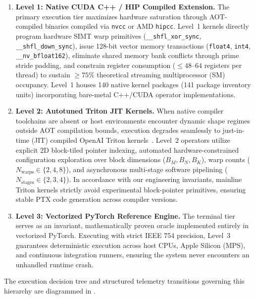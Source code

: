 \begin{enumerate}
    \item \textbf{Level 1: Native CUDA C++ / HIP Compiled Extension.}
    The primary execution tier maximizes hardware saturation through AOT-compiled binaries compiled via \texttt{nvcc} or AMD \texttt{hipcc}. Level~1 kernels directly program hardware SIMT warp primitives (\texttt{\_\_shfl\_xor\_sync}, \texttt{\_\_shfl\_down\_sync}), issue 128-bit vector memory transactions (\texttt{float4}, \texttt{int4}, \texttt{\_\_nv\_bfloat162}), eliminate shared memory bank conflicts through prime stride padding, and constrain register consumption ($\le 48\text{--}64$ registers per thread) to sustain $\ge 75\%$ theoretical streaming multiprocessor (SM) occupancy. Level~1 houses 140 native kernel packages (141 package inventory units) incorporating bare-metal C++/CUDA operator implementations.
    
    \item \textbf{Level 2: Autotuned Triton JIT Kernels.}
    When native compiler toolchains are absent or host environments encounter dynamic shape regimes outside AOT compilation bounds, execution degrades seamlessly to just-in-time (JIT) compiled OpenAI Triton kernels~\cite{tillet2019triton}. Level~2 operators utilize explicit 2D block-tiled pointer indexing, automated hardware-constrained configuration exploration over block dimensions ($B_M, B_N, B_K$), warp counts ($N_{\text{warps}} \in \{2, 4, 8\}$), and asynchronous multi-stage software pipelining ($N_{\text{stages}} \in \{2, 3, 4\}$). In accordance with our engineering invariants, mainline Triton kernels strictly avoid experimental block-pointer primitives, ensuring stable PTX code generation across compiler versions.
    
    \item \textbf{Level 3: Vectorized PyTorch Reference Engine.}
    The terminal tier serves as an invariant, mathematically proven oracle implemented entirely in vectorized PyTorch. Executing with strict IEEE 754 precision, Level~3 guarantees deterministic execution across host CPUs, Apple Silicon (MPS), and continuous integration runners, ensuring the system never encounters an unhandled runtime crash.
\end{enumerate}

The execution decision tree and structured telemetry transitions governing this hierarchy are diagrammed in .

